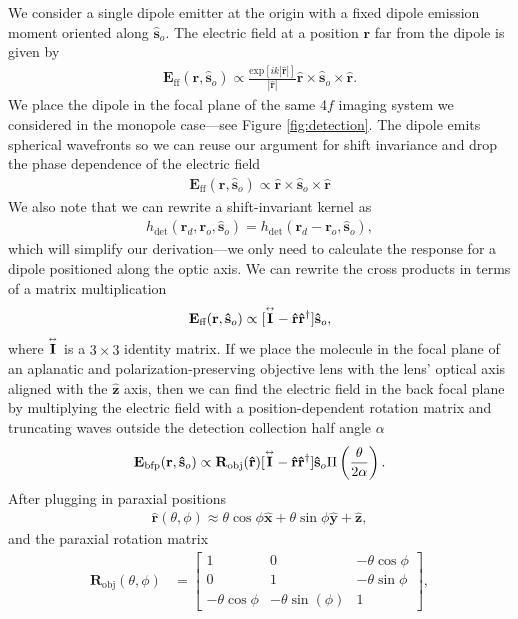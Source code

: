 \documentclass[]{osa-article}
\newcommand{\tensor}[1]{\overset{\text{\tiny$\leftrightarrow$}}{\mb{#1}}}
\providecommand{\mb}[1]{\mathbf{#1}}
\providecommand{\ro}{\mathbf{\mathbf{r}}_o}
\providecommand{\so}{\mathbf{\hat{s}}_o}
\providecommand{\rd}{\mathbf{r}_d}
\providecommand{\mh}[1]{\mathbf{\hat{#1}}}
\begin{document}
We consider a single dipole emitter at the origin with a fixed dipole emission
moment oriented along $\so{}$. The electric field at a position $\mb{r}$ far
from the dipole is given by
\begin{align}
  \mb{E}_{\text{ff}}(\mb{r}, \so{}) \propto \frac{\text{exp}[ik|\mh{r}|]}{|\mh{r}|}\mh{r} \times \so{} \times \mh{r}. \label{eq:ff}
\end{align}
We place the dipole in the focal plane of the same 4$f$ imaging system we
considered in the monopole case---see Figure \ref{fig:detection}. The dipole emits
spherical wavefronts so we can reuse our argument for shift invariance and drop
the phase dependence of the electric field
\begin{align}
  \mb{E}_{\text{ff}}(\mb{r}, \so{}) \propto \mh{r} \times \so{} \times \mh{r} \label{eq:ff2}
\end{align}
We also note that we can rewrite a shift-invariant kernel as
\begin{align}
h_{\text{det}}(\rd, \ro, \so) = h_{\text{det}}(\rd - \ro, \so), 
\end{align}
which will simplify our derivation---we only need to calculate the response for
a dipole positioned along the optic axis. We can rewrite the cross products in terms
of a matrix multiplication
\begin{align}
  \mb{E}_{\text{ff}}(\mb{r}, \so{}) \propto [\tensor{I} - \mh{r}\mh{r}^{\dagger}]\so,
\end{align}
where $\tensor{I}$ is a $3\times 3$ identity matrix. If we place the molecule in
the focal plane of an aplanatic and polarization-preserving objective lens with
the lens' optical axis aligned with the $\mh{z}$ axis, then we can find the
electric field in the back focal plane by multiplying the electric field with a
position-dependent rotation matrix and truncating waves outside the detection
collection half angle $\alpha$
\begin{align}
  \mb{E}_{\text{bfp}}(\mb{r}, \so{}) \propto \mb{R}_{\text{obj}}(\mh{r})[\tensor{I} - \mh{r}\mh{r}^{\dagger}]\so\Pi\left(\frac{\theta}{2\alpha}\right).
\end{align}
After plugging in paraxial positions
\begin{align}
  \mh{r}(\theta,\phi) \approx \theta\cos\phi\mh{x} + \theta\sin\phi\mh{y} + \mh{z},
\end{align}
and the paraxial rotation matrix
\begin{align}
  \mb{R}_{\text{obj}}(\theta, \phi) &=
  \begin{bmatrix}
    1 & 0 &-\theta \cos\phi\\
    0 & 1 &-\theta \sin\phi\\
    -\theta\cos\phi&-\theta \sin(\phi)&1
  \end{bmatrix},
\end{align}
\end{document}
